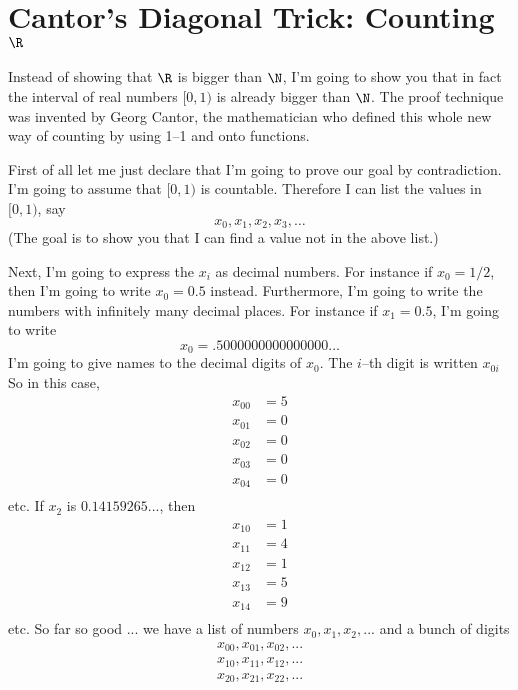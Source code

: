 \section{Cantor's Diagonal Trick: Counting $\R$}

Instead of showing that $\R$ is bigger than $\N$, I'm going to show 
you that in fact the interval of real numbers 
$[0, 1)$ is already bigger than $\N$.
The proof technique was invented by Georg Cantor, the mathematician
who defined this whole new way of counting by using 1--1 and onto functions.

First of all let me just declare that I'm going to prove our goal by 
contradiction.
I'm going to assume that $[0,1)$ is countable.
Therefore I can list the values in $[0,1)$, say
\[
x_0, x_1, x_2, x_3, \ldots
\]
(The goal
is to show you that I can find a value not in the above list.)

Next, I'm going to express the $x_i$ as decimal numbers.
For instance if $x_0 = 1/2$, then I'm going to write $x_0 = 0.5$ instead.
Furthermore, I'm going to write the numbers with infinitely many decimal
places.
For instance if $x_1 = 0.5$, I'm going to write
\[
x_0 = .5000000000000000\ldots
\]
I'm going to give names to the decimal digits of $x_0$.
The $i$--th digit is written $x_{0i}$
So in this case,
\begin{align*}
x_{00} &= 5 \\
x_{01} &= 0 \\
x_{02} &= 0 \\
x_{03} &= 0 \\
x_{04} &= 0 \\
\end{align*}
etc.
If $x_2$ is $0.14159265...$, then
\begin{align*}
x_{10} &= 1 \\
x_{11} &= 4 \\
x_{12} &= 1 \\
x_{13} &= 5 \\
x_{14} &= 9 \\
\end{align*}
etc.
So far so good ... we have a list of numbers $x_0, x_1, x_2, ...$ 
and a bunch of digits
\begin{align*}
x_{00}, x_{01}, x_{02}, ... \\
x_{10}, x_{11}, x_{12}, ... \\
x_{20}, x_{21}, x_{22}, ... \\
\end{align*}

